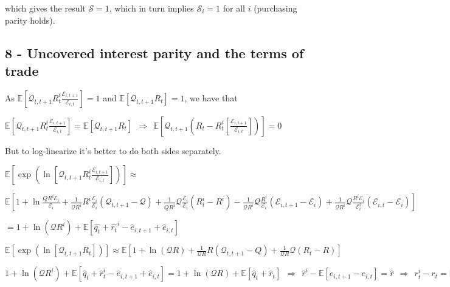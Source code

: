 \documentclass[
]{article}
\begin{document}
which gives the result \(\mathcal{S}=1\), which in turn implies
\(\mathcal{S}_i=1\) for all \(i\) (purchasing parity holds).

\hypertarget{uncovered-interest-parity-and-the-terms-of-trade}{%
\subsection{8 - Uncovered interest parity and the terms of
trade}\label{uncovered-interest-parity-and-the-terms-of-trade}}

As
\(\displaystyle \mathbb{E}\left[ \mathcal{Q}_{t,t+1} R_t^i \frac{\mathcal{E}_{i,t+1} }{\mathcal{E}_{i,t} }\right] = 1\)
and
\(\displaystyle \mathbb{E}\left[ \mathcal{Q}_{t,t+1} R_t \right] = 1\),
we have that

\(\displaystyle \mathbb{E}\left[ \mathcal{Q}_{t,t+1} R_t^i \frac{\mathcal{E}_{i,t+1} }{\mathcal{E}_{i,t} }\right] = \displaystyle \mathbb{E}\left[ \mathcal{Q}_{t,t+1} R_t \right] \ \ \Rightarrow \ \  \mathbb{E}\left[ \mathcal{Q}_{t,t+1} \left(R_t-R_t^i \left[ \frac{\mathcal{E}_{i,t+1} }{\mathcal{E}_{i,t} } \right] \right) \right] = 0\)

But to log-linearize it's better to do both sides separately.

\(\displaystyle \mathbb{E} \left[\exp \left( \ln \left[ \mathcal{Q}_{t,t+1} R_t^i \frac{\mathcal{E}_{i,t+1} }{\mathcal{E}_{i,t} }\right] \right) \right] \approx\)

\(\displaystyle \mathbb{E} \left[ 1 + \ln\frac{Q R^i \mathcal{E}_{i}}{\mathcal{E}_{i}}+\frac{1}{\mathcal{Q}R^i}R^i \frac{ \mathcal{E}_{i}}{\mathcal{E}_{i}}(\mathcal{Q}_{t,t+1}-\mathcal{Q}) + \frac{1}{QR^i}\mathcal{Q} \frac{ \mathcal{E}_{i}}{\mathcal{E}_{i}}(R_t^i-R^i) - \frac{1}{\mathcal{Q}R^i}\mathcal{Q} \frac{R^i}{\mathcal{E}_{i}}(\mathcal{E}_{i,t+1}-\mathcal{E}_i) + \frac{1}{\mathcal{Q}R^i}\mathcal{Q} \frac{R^i \mathcal{E}_{i}}{\mathcal{E}_{i}^2}(\mathcal{E}_{i,t}-\mathcal{E}_i) \right]\)

\(\displaystyle = 1+ \ln(\mathcal{Q}R^i) + \mathbb{E} \left[ \hat{q_t}+\hat{r_t}^i - \hat{e}_{i,t+1}+\hat{e}_{i,t}\right]\)

\(\displaystyle \mathbb{E} \left[\exp \left( \ln \left[ \mathcal{Q}_{t,t+1} R_t \right] \right) \right] \approx \mathbb{E} \left[ 1 + \ln(\mathcal{Q}R) +\frac{1}{\mathcal{Q}R}R (\mathcal{Q}_{t,t+1}-Q) +\frac{1}{\mathcal{Q}R} \mathcal{Q} (R_t-R)\right]\)

\(\displaystyle 1+ \ln(\mathcal{Q}R^i) + \mathbb{E} \left[ \hat{q}_t+\hat{r}_t^i - \hat{e}_{i,t+1} + \hat{e}_{i,t}\right] = 1 + \ln(\mathcal{Q}R) + \mathbb{E} \left[ \hat{q}_t + \hat{r}_t \right] \ \ \Rightarrow \ \ \hat{r}^i - \mathbb{E} \left[ e_{i,t+1}-e_{i,t}\right] = \hat{r} \ \ \Rightarrow \ \ r_t^i-r_t=\mathbb{E}_t[\Delta e_{i,t+1}]\)
\end{document}
